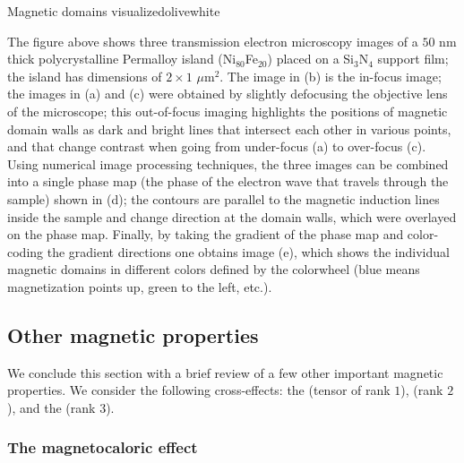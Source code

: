 \begin{messagebox}{Magnetic domains visualized}{olive}{\icinfo}{white}
\begin{minipage}{\textwidth}
\vspace{.8em}
\vspace{.7em}
The figure above shows three transmission electron microscopy images of a $50$ nm thick polycrystalline Permalloy island (Ni$_{80}$Fe$_{20}$) placed on a Si$_3$N$_4$ support film; the island has dimensions of $2\times 1$ $\mu$m$^2$.  The image in (b) is the in-focus image; the images in (a) and (c) were obtained by slightly defocusing the objective lens of the microscope; this out-of-focus imaging highlights the positions of magnetic domain walls as dark and bright lines that intersect each other in various points, and that change contrast when going from under-focus (a) to over-focus (c). Using numerical image processing techniques, the three images can be combined into a single phase map (the phase of the electron wave that travels through the sample) shown in (d); the contours are parallel to the magnetic induction lines inside the sample and change direction at the domain walls, which were overlayed on the phase map. Finally, by taking the gradient of the phase map and color-coding the gradient directions one obtains image (e), which shows the individual magnetic domains in different colors defined by the colorwheel (blue means magnetization points up, green to the left, etc.).
\end{minipage} 
\end{messagebox}

\subsection{Other magnetic properties}

We conclude this section with a brief review of a few other important magnetic properties.  We consider the  following cross-effects: the  (tensor of rank $1$),  (rank $2$), and the  (rank $3$).

\subsubsection{The magnetocaloric effect}\label{\chabbr:ssec:magnetocaloric}

